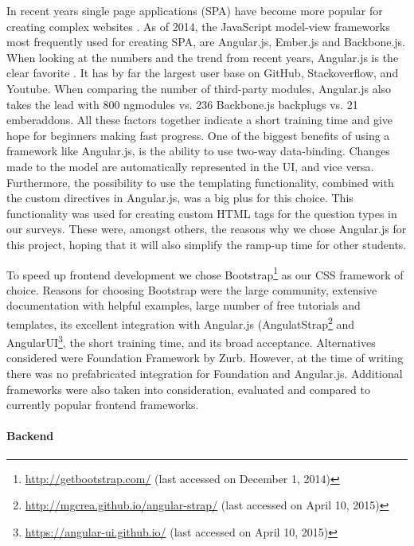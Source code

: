 		In recent years single page applications (SPA) have become more popular for creating complex websites \cite{Medium2013SPA, Tutsplus2013SPA}. As of 2014, the JavaScript model-view frameworks most frequently used for creating SPA, are Angular.js, Ember.js and Backbone.js. When looking at the numbers and the trend from recent years, Angular.js is the clear favorite \cite{AirPair2014MEAN}. It has by far the largest user base on GitHub, Stackoverflow, and Youtube. When comparing the number of third-party modules, Angular.js also takes the lead with 800 ngmodules vs. 236 Backbone.js backplugs vs. 21 emberaddons. All these factors together indicate a short training time and give hope for beginners making fast progress. One of the biggest benefits of using a framework like Angular.js, is the ability to use two-way data-binding. Changes made to the model are automatically represented in the UI, and vice versa. Furthermore, the possibility to use the templating functionality, combined with the custom directives in Angular.js, was a big plus for this choice. This functionality was used for creating custom HTML tags for the question types in our surveys. These were, amongst others, the reasons why we chose Angular.js for this project, hoping that it will also simplify the ramp-up time for other students.

		To speed up frontend development we chose Bootstrap\footnote{\url{http://getbootstrap.com/} (last accessed on December 1, 2014)} as our CSS framework of choice. Reasons for choosing Bootstrap were the large community, extensive documentation with helpful examples, large number of free tutorials and templates, its excellent integration with Angular.js (AngulatStrap\footnote{\url{http://mgcrea.github.io/angular-strap/} (last accessed on April 10, 2015)} and AngularUI\footnote{\url{https://angular-ui.github.io/} (last accessed on April 10, 2015)}, the short training time, and its broad acceptance.
		Alternatives considered were Foundation Framework by Zurb. However, at the time of writing there was no prefabricated integration for Foundation and Angular.js.
		Additional frameworks were also taken into consideration, evaluated \cite{Sitepoint2014FrontendFrameworks} and compared \cite{Sitepoint2015CSSFrameworks} to currently popular frontend frameworks.
	

	\paragraph{Backend}

